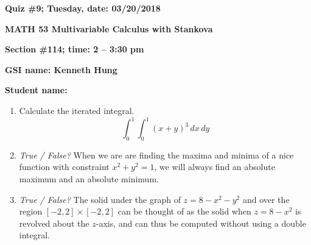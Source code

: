 \documentclass{article}
\begin{document}
{\bf Quiz \#9; Tuesday, date: 03/20/2018}

{\bf MATH 53 Multivariable Calculus with Stankova}

{\bf Section \#114; time: 2 -- 3:30 pm}

{\bf GSI name: Kenneth Hung}

{\bf Student name:}

\vspace*{0.25in}

\begin{enumerate}
\item Calculate the iterated integral.
\[
\int_0^1 \int_0^1 (x + y)^3 \,dx \,dy
\]

\item {\em True / False?} When we are are finding the maxima and minima of a nice function with constraint $x^2 + y^2 = 1$, we will always find an absolute maximum and an absolute minimum.

\item {\em True / False?} The solid under the graph of $z = 8 - x^2 - y^2$ and over the region $[-2, 2] \times [-2, 2]$ can be thought of as the solid when $z = 8 - x^2$ is revolved about the $z$-axis, and can thus be computed without using a double integral.
\end{enumerate}
\end{document}
